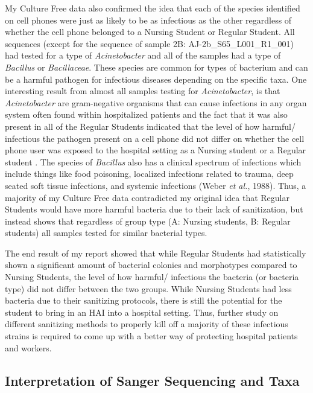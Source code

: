 \documentclass[]{article}
\begin{document}
My Culture Free data also confirmed the idea that each of the species
identified on cell phones were just as likely to be as infectious as the
other regardless of whether the cell phone belonged to a Nursing Student
or Regular Student. All sequences (except for the sequence of sample 2B:
AJ-2b\_S65\_L001\_R1\_001) had tested for a type of \emph{Acinetobacter}
and all of the samples had a type of \emph{Bacillus} or
\emph{Bacillaceae}. These species are common for types of bacterium and
can be a harmful pathogen for infectious diseases depending on the
specific taxa. One interesting result from almost all samples testing
for \emph{Acinetobacter}, is that \emph{Acinetobacter} are gram-negative
organisms that can cause infections in any organ system often found
within hospitalized patients and the fact that it was also present in
all of the Regular Students indicated that the level of how harmful/
infectious the pathogen present on a cell phone did not differ on
whether the cell phone user was exposed to the hospital setting as a
Nursing student or a Regular student . The species of \emph{Bacillus}
also has a clinical spectrum of infections which include things like
food poisoning, localized infections related to trauma, deep seated soft
tissue infections, and systemic infections (Weber \emph{et al.}, 1988).
Thus, a majority of my Culture Free data contradicted my original idea
that Regular Students would have more harmful bacteria due to their lack
of sanitization, but instead shows that regardless of group type (A:
Nursing students, B: Regular students) all samples tested for similar
bacterial types.

The end result of my report showed that while Regular Students had
statistically shown a significant amount of bacterial colonies and
morphotypes compared to Nursing Students, the level of how harmful/
infectious the bacteria (or bacteria type) did not differ between the
two groups. While Nursing Students had less bacteria due to their
sanitizing protocols, there is still the potential for the student to
bring in an HAI into a hospital setting. Thus, further study on
different sanitizing methods to properly kill off a majority of these
infectious strains is required to come up with a better way of
protecting hospital patients and workers.

\hypertarget{interpretation-of-sanger-sequencing-and-taxa}{%
\subsection{Interpretation of Sanger Sequencing and
Taxa}\label{interpretation-of-sanger-sequencing-and-taxa}}
\end{document}
